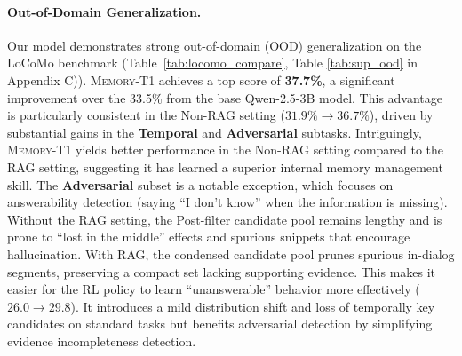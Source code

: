 \documentclass{article} %
\begin{document}
\paragraph{Out-of-Domain Generalization.} Our model demonstrates strong out-of-domain (OOD) generalization on the LoCoMo benchmark (Table~\ref{tab:locomo_compare}, Table \ref{tab:sup_ood} in Appendix C)). \textsc{Memory-T1} achieves a top score of \textbf{37.7\%}, a significant improvement over the 33.5\% from the base Qwen-2.5-3B model. This advantage is particularly consistent in the Non-RAG setting ($31.9\% \to 36.7\%$), driven by substantial gains in the \textbf{Temporal} and \textbf{Adversarial} subtasks. Intriguingly, \textsc{Memory-T1} yields better performance in the Non-RAG setting compared to the RAG setting, suggesting it has learned a superior internal memory management skill. The \textbf{Adversarial} subset is a notable exception, which focuses on answerability detection (saying “I don’t know” when the information is missing). Without the RAG setting, the Post-filter candidate pool remains lengthy and is prone to “lost in the middle” effects and spurious snippets that encourage hallucination. With RAG, the condensed candidate pool prunes spurious in-dialog segments, preserving a compact set lacking supporting evidence. This makes it easier for the RL policy to learn “unanswerable” behavior more effectively ($26.0 \to 29.8$). It introduces a mild distribution shift and loss of temporally key candidates on standard tasks but benefits adversarial detection by simplifying evidence incompleteness detection.




\end{document}
